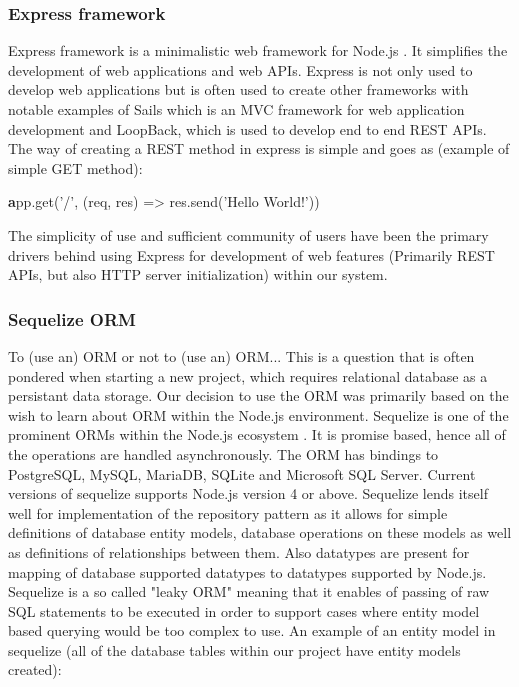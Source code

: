 \subsubsection{Express framework}
\label{subsubsec:express}

Express framework is a minimalistic web framework for Node.js \citep{express}. It simplifies the development of web applications and web APIs. Express is not only used to develop web applications but is often used to create other frameworks with notable examples of Sails which is an MVC framework for web application development and LoopBack, which is used to develop end to end REST APIs. The way of creating a REST method in express is simple and goes as (example of simple GET method):\newline 

\smallskip
{\textbf app.get('/', (req, res) => res.send('Hello World!'))}
\newline
\smallskip

The simplicity of use and sufficient community of users have been the primary drivers behind using Express for development of web features (Primarily REST APIs, but also HTTP server initialization) within our system.

\subsubsection{Sequelize ORM}
\label{subsubsec:sequelize}

To (use an) ORM or not to (use an) ORM... This is a question that is often pondered when starting a new project, which requires relational database as a persistant data storage. Our decision to use the ORM was primarily based on the wish to learn about ORM within the Node.js environment. Sequelize is one of the prominent ORMs within the Node.js ecosystem \citep{sequelize}. It is promise based, hence all of the operations are handled asynchronously. The ORM has bindings to PostgreSQL, MySQL, MariaDB, SQLite and Microsoft SQL Server. Current versions of sequelize supports Node.js version 4 or above. Sequelize lends itself well for implementation of the repository pattern as it allows for simple definitions of database entity models, database operations on these models as well as definitions of relationships between them. Also datatypes are present for mapping of database supported datatypes to datatypes supported by Node.js. Sequelize is a so called "leaky ORM" meaning that it enables of passing of raw SQL statements to be executed in order to support cases where entity model based querying would be too complex to use. An example of an entity model in sequelize (all of the database tables within our project have entity models created):\newline

